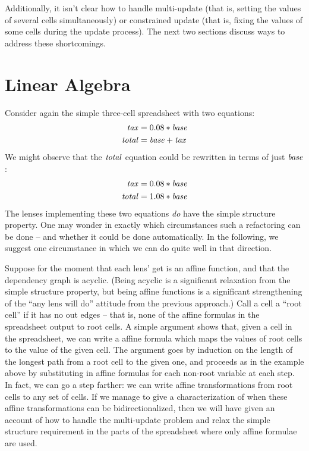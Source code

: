\documentclass{article}
\begin{document}
Additionally, it isn't clear how to handle multi-update (that is, setting
the values of several cells simultaneously) or constrained update (that is,
fixing the values of some cells during the update process). The next two
sections discuss ways to address these shortcomings.

\section{Linear Algebra}
\label{sec:global-analysis}
Consider again the simple three-cell spreadsheet with two equations:
\begin{align*}
    \mathit{tax} &= 0.08*\mathit{base} \\
    \mathit{total} &= \mathit{base}+\mathit{tax}
\end{align*}
We might observe that the $\mathit{total}$ equation could be rewritten in terms of
just $\mathit{base}$:
\begin{align*}
    \mathit{tax}   &= 0.08*\mathit{base} \\
    \mathit{total} &= 1.08*\mathit{base}
\end{align*}
The lenses implementing these two equations \emph{do} have the simple
structure property. One may wonder in exactly which circumstances such a
refactoring can be done -- and whether it could be done automatically. In
the following, we suggest one circumstance in which we can do quite well in
that direction.

Suppose for the moment that each lens' get is an affine function, and that
the dependency graph is acyclic. (Being acyclic is a significant relaxation
from the simple structure property, but being affine functions is a
significant strengthening of the ``any lens will do'' attitude from the
previous approach.) Call a cell a ``root cell'' if it has no out edges --
that is, none of the affine formulas in the spreadsheet output to root
cells. A simple argument shows that, given a cell in the spreadsheet, we
can write a affine formula which maps the values of root cells to the value
of the given cell. The argument goes by induction on the length of the
longest path from a root cell to the given one, and proceeds as in the
example above by substituting in affine formulas for each non-root variable
at each step. In fact, we can go a step farther: we can write affine
transformations from root cells to any set of cells. If we manage to give a
characterization of when these affine transformations can be
bidirectionalized, then we will have given an account of how to handle the
multi-update problem and relax the simple structure requirement in the parts
of the spreadsheet where only affine formulae are used.
\end{document}

